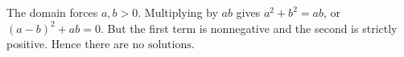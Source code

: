 The domain forces $a,b>0$. Multiplying by $ab$ gives $a^2+b^2=ab$, or $(a-b)^2+ab=0$. But the first term is nonnegative and the second is strictly positive. Hence there are $\boxed{\text{no solutions}}$.
